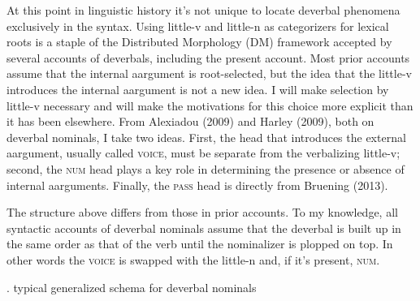 \documentclass[12pt]{article}
\newcommand*{\textsub}[1]{\ensuremath{_\textrm{{\scriptsize #1}}}}
\begin{document}
At this point in linguistic history it's not unique to locate deverbal phenomena exclusively in the syntax. Using little-v and little-n as categorizers for lexical roots is a staple of the Distributed Morphology (DM) framework accepted by several accounts of deverbals, including the present account. Most prior accounts assume that the internal aargument is root-selected, but the idea that the little-v introduces the internal aargument is not a new idea. I will make selection by little-v necessary and will make the motivations for this choice more explicit than it has been elsewhere. From Alexiadou (2009) and Harley (2009), both on deverbal nominals, I take two ideas. First, the head that introduces the external aargument, usually called \textsc{voice}, must be separate from the verbalizing little-v; second, the \textsc{num} head plays a key role in determining the presence or absence of internal aarguments. Finally, the \textsc{pass} head is directly from Bruening (2013).

The structure above differs from those in prior accounts. To my knowledge, all syntactic accounts of deverbal nominals assume that the deverbal is built up in the same order as that of the verb until the nominalizer is plopped on top. In other words the \textsc{voice} is swapped with the little-n and, if it's present, \textsc{num}.

\singlespacing

\ex. \label{schema1} typical generalized schema for deverbal nominals

\vspace*{-10pt}
\par \hfill \par
\doublespacing
\end{document}
